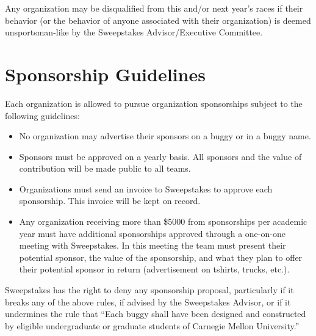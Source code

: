 	Any organization may be disqualified from this and/or next year's races if their behavior (or the behavior of anyone associated with their organization) is deemed unsportsman-like by the Sweepstakes Advisor/Executive Committee.

\section{Sponsorship Guidelines}

	Each organization is allowed to pursue organization sponsorships subject to the following guidelines:

	\begin{itemize}
		\item No organization may advertise their sponsors on a buggy or in a buggy name.
  
		\item Sponsors must be approved on a yearly basis. All sponsors and the value of contribution will be made public to all teams.

		\item Organizations must send an invoice to Sweepstakes to approve each sponsorship. This invoice will be kept on record.
  
		\item Any organization receiving more than \$5000 from sponsorships per academic year must have additional sponsorships approved through a one-on-one meeting with Sweepstakes. In this meeting the team must present their potential sponsor, the value of the sponsorship, and what they plan to offer their potential sponsor in return (advertisement on tshirts, trucks, etc.).
	\end{itemize}

	Sweepstakes has the right to deny any sponsorship proposal, particularly if it breaks any of the above rules, if advised by the Sweepstakes Advisor, or if it undermines the rule that “Each buggy shall have been designed and constructed by eligible undergraduate or graduate students of Carnegie Mellon University.”
